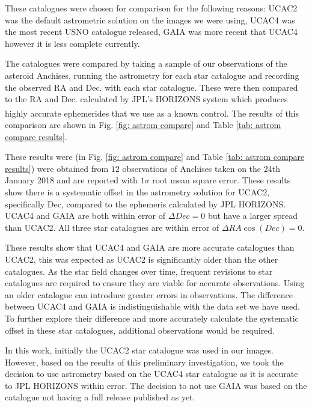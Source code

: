 \documentclass[10pt, twocolumn]{revtex4}    %
\newcommand{\scite}[1]{\textsuperscript{\cite{#1}}}
\begin{document}
These catalogues were chosen for comparison for the following reasons: UCAC2 was the default astrometric solution on the images we were using, UCAC4 was the most recent USNO catalogue released, GAIA was more recent that UCAC4 however it is less complete currently.

The catalogues were compared by taking a sample of our observations of the asteroid Anchises, running the astrometry for each star catalogue and recording the observed RA and Dec. with each star catalogue. These were then compared to the RA and Dec. calculated by JPL's HORIZONS system which produces highly accurate ephemerides that we use as a known control.\scite{HORIZONSSystem} The results of this comparison are shown in Fig. \ref{fig: astrom compare} and Table \ref{tab: astrom compare results}.

These results were (in Fig. \ref{fig: astrom compare} and Table \ref{tab: astrom compare results}) were obtained from  $12$ observations of Anchises taken on the 24th January 2018 and are reported with $1\sigma$ root mean square error. These results show there is a systematic offset in the astrometry solution for UCAC2, specifically Dec, compared to the ephemeris calculated by JPL HORIZONS. UCAC4 and GAIA are both within error of $\Delta Dec = 0$ but have a larger spread than UCAC2. All three star catalogues are within error of $\Delta RA \cos (Dec)=0$.

These results show that UCAC4 and GAIA are more accurate catalogues than UCAC2, this was expected as UCAC2 is significantly older than the other catalogues. As the star field changes over time, frequent revisions to star catalogues are required to ensure they are viable for accurate observations. Using an older catalogue can introduce greater errors in observations. The difference between UCAC4 and GAIA is indistinguishable with the data set we have used. To further explore their difference and more accurately calculate the systematic offset in these star catalogues, additional observations would be required.

In this work, initially the UCAC2 star catalogue was used in our images. However, based on the results of this preliminary investigation, we took the decision to use astrometry based on the UCAC4 star catalogue as it is accurate to JPL HORIZONS within error. The decision to not use GAIA was based on the catalogue not having a full release published as yet.
\end{document}
